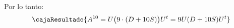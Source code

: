\begin{enumerate}[label=(\alph*)]
        Por lo tanto:
        $$
          \cajaResultado{
            A^{10} =
            U\big( 9\cdot (D + 10S)\big) U^t =
            9U (D + 10S) U^t
          }
        $$
\end{enumerate}

\begin{aportes}
  \item {}
\end{aportes}
